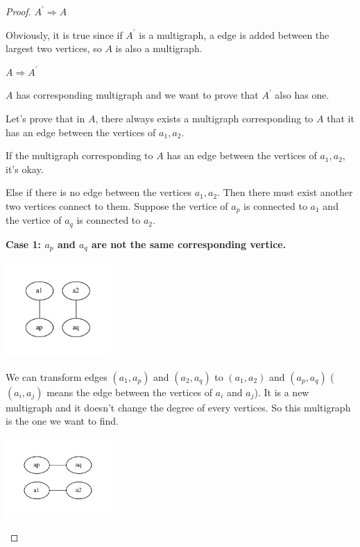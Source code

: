 \begin{proof}
$A^\prime \Rightarrow A$

Obviously, it is true since if $A^\prime$ is a multigraph, a edge is added between the largest two vertices, so $A$ is also a multigraph.

$A \Rightarrow A^\prime$

$A$ has corresponding multigraph and we want to prove that $A^\prime$ also has one.

Let's prove that in $A$, there always exists a multigraph corresponding to $A$ that it has an edge between the vertices of $a_1,a_2$.

If the multigraph corresponding to $A$ has an edge between the vertices of $a_1,a_2$, it's okay.

Else if there is no edge between the vertices $a_1, a_2$. Then there must exist another two vertices connect to them. Suppose the vertice of $a_p$ is connected to $a_1$ and the vertice of $a_q$ is connected to $a_2$.

\textbf{Case 1: $a_p$ and $a_q$ are not the same corresponding vertice.}
\begin{center}
  \includegraphics[width=0.3\textwidth]{./figures/7-2-Case1-before.pdf}
\end{center}

We can transform edges $(a_1, a_p)$ and $(a_2, a_q)$ to $(a_1, a_2)$ and $(a_p, a_q)$ ($(a_i,a_j)$ means the edge between the vertices of $a_i$ and $a_j$). It is a new multigraph and it doesn't change the degree of every vertices. So this multigraph is the one we want to find.

\begin{center}
  \includegraphics[width=0.3\textwidth]{./figures/7-2-Case1-after.pdf}
\end{center}


\end{proof}
